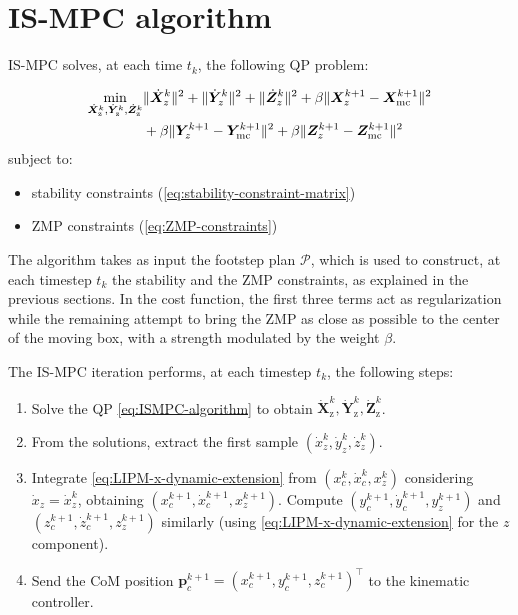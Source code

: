 \section{IS-MPC algorithm}
IS-MPC solves, at each time $t_k$, the following QP problem:
\begin{braced}
\begin{equation}
\begin{split}
\min_{\dot{\bm{X}}_\text{z}^k, \dot{\bm{Y}}_\text{z}^k, \dot{\bm{Z}}_\text{z}^k}
&\|\dot{\bm{X}}_z^k\|^2 + \|\dot{\bm{Y}}_z^k\|^2 + \|\dot{\bm{Z}}_z^k\|^2+\beta \|\bm{X}_z^{k+1} - {\bm{X}}_{\rm mc}^{k+1}\|^2 \\& + \beta \|\bm{Y}_z^{k+1} - {\bm{Y}}_{\rm mc}^{k+1}\|^2 + \beta \|\bm{Z}_z^{k+1} - {\bm{Z}}_{\rm mc}^{k+1}\|^2 \\
\end{split}
\label{eq:ISMPC-algorithm}
\end{equation}
\hspace{0.25cm} subject to:
\begin{itemize}
    \item stability constraints (\ref{eq:stability-constraint-matrix})
    \item ZMP constraints (\ref{eq:ZMP-constraints})
\end{itemize}
\end{braced}

The algorithm takes as input the footstep plan $\mathcal{P}$, which is used
to construct, at each timestep $t_k$ the stability and the ZMP constraints,
as explained in the previous sections.
In the cost function, the first three terms act as regularization while the
remaining attempt to bring the ZMP as close as possible to the center of the
moving box, with a strength modulated by the weight $\beta$.

The IS-MPC iteration performs, at each timestep $t_k$, the following steps:
\begin{enumerate}
    \item Solve the QP \eqref{eq:ISMPC-algorithm} to obtain 
        $\dot{\bm{X}}_\text{z}^k, \dot{\bm{Y}}_\text{z}^k, \dot{\bm{Z}}_\text{z}^k$.
    \item From the solutions, extract the first sample $(\dot x_z^k, \dot y_z^k, \dot z_z^k)$.
    \item Integrate \eqref{eq:LIPM-x-dynamic-extension} from
        $(x_c^k, \dot{x}_c^k, x_z^k)$ considering $\dot{x}_z=\dot{x}_z^k$, obtaining
        $(x_c^{k+1}, \dot{x}_c^{k+1}, x_z^{k+1})$.
        Compute $(y_c^{k+1}, \dot{y}_c^{k+1}, y_z^{k+1})$ and 
        $(z_c^{k+1}, \dot{z}_c^{k+1}, z_z^{k+1})$ similarly (using
        \eqref{eq:LIPM-x-dynamic-extension} for the $z$ component).
    \item Send the CoM position $\bm{p}_c^{k+1}=(x_c^{k+1}, y_c^{k+1}, z_c^{k+1})^\top$
        to the kinematic controller.
\end{enumerate}

